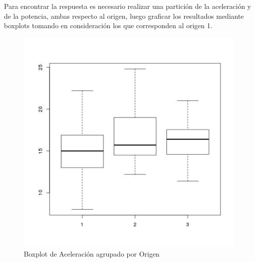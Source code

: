 \documentclass[letter,10pt]{article}
\begin{document}
Para encontrar la respuesta es necesario realizar una partición de la aceleración y de la potencia, ambas respecto al origen, luego graficar los resultados
mediante boxplots tomando en consideración los que corresponden al origen 1.

  \begin{minipage}{\linewidth}
      \centering
      \begin{minipage}{0.45\linewidth}
          \begin{figure}[H]
              \includegraphics[width=\linewidth]{boxplot_acceleration_origin.jpg}
              \caption{Boxplot de Aceleración agrupado por Origen}
          \end{figure}
      \end{minipage}
      \hspace{0.05\linewidth}
      \begin{minipage}{0.45\linewidth}
          \begin{figure}[H]

\end{figure}
\end{minipage}
\end{minipage}
\end{document}
